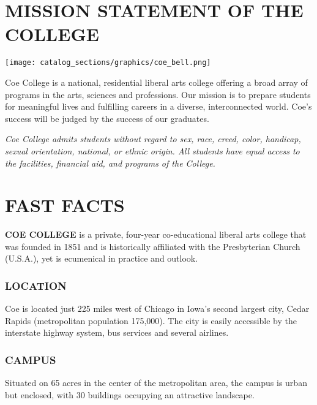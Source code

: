 \documentclass[
  letterpaper,
]{scrbook}
\newcommand{\pandocbounded}[1]{#1}
\begin{document}
\chapter{MISSION STATEMENT OF THE
COLLEGE}\label{sec-mission-statement-of-college}

\begin{center}
\pandocbounded{\texttt{[image: catalog\_sections/graphics/coe\_bell.png]}}
\end{center}


Coe College is a national, residential liberal arts college offering a
broad array of programs in the arts, sciences and professions. Our
mission is to prepare students for meaningful lives and fulfilling
careers in a diverse, interconnected world. Coe's success will be judged
by the success of our graduates.

\emph{Coe College admits students without regard to sex, race, creed,
color, handicap, sexual orientation, national, or ethnic origin. All
students have equal access to the facilities, financial aid, and
programs of the College.}

\chapter{FAST FACTS}\label{sec-fast-facts}

\textbf{COE COLLEGE} is a private, four-year co-educational liberal arts
college that was founded in 1851 and is historically affiliated with the
Presbyterian Church (U.S.A.), yet is ecumenical in practice and outlook.

\subsection{LOCATION}\label{location}

Coe is located just 225 miles west of Chicago in Iowa's second largest
city, Cedar Rapids (metropolitan population 175,000). The city is easily
accessible by the interstate highway system, bus services and several
airlines.

\subsection{CAMPUS}\label{campus}

Situated on 65 acres in the center of the metropolitan area, the campus
is urban but enclosed, with 30 buildings occupying an attractive
landscape.
\end{document}
